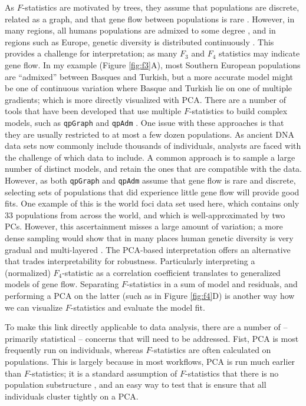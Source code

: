 \documentclass[12pt,fullpage, a4paper]{article}
\begin{document}
As $F$-statistics are motivated by trees, they assume that populations are discrete, related as a graph, and that gene flow between populations is rare \citep{patterson2012,harney2021}. However, in many regions, all humans populations are admixed to some degree \citep{pickrell2014}, and in regions such as Europe, genetic diversity is distributed continuously \citep{novembre2008, novembre2008a}. This provides a challenge for interpretation; as many $F_3$ and $F_4$ statistics may indicate gene flow. In my example (Figure \ref{fig:f3}A), most Southern European populations are ``admixed'' between Basques and Turkish, but a more accurate model might be one of continuous variation where Basque and Turkish lie on one of multiple gradients; which is more directly visualized with PCA. There are a number of tools that have been developed that use multiple $F$-statistics to build complex models, such as \texttt{qpGraph} \citep{lazaridis2014} and \texttt{qpAdm} \citep{harney2021}. One issue with these approaches is that they are usually restricted to at most a few dozen populations. As ancient DNA data sets now commonly include thousands of individuals, analysts are faced with the challenge of which data to include. A common approach is to sample a large number of distinct models, and retain the ones that are compatible with the data. However, as both \texttt{qpGraph} and \texttt{qpAdm} assume that gene flow is rare and discrete, selecting sets of populations that did experience little gene flow will provide good fits. One example of this is the world foci data set used here, which contains only 33 populations from across the world, and which is well-approximated by two PCs. However, this ascertainment misses a large amount of variation; a more dense sampling would show that in many places human genetic diversity is very gradual and multi-layered \citep{lazaridis2014, peter2020a}. The PCA-based  interpretation offers an alternative that trades interpretability for robustness. Particularly interpreting a (normalized) $F_4$-statistic as a correlation coefficient translates to generalized models of gene flow. Separating $F$-statistics in a sum of model and residuals, and performing a PCA on the latter (such as in Figure \ref{fig:f4}D)  is another way how we can visualize $F$-statistics and evaluate the model fit.

To make this link directly applicable to data analysis, there are a number of -- primarily statistical -- concerns that will need to be addressed. Fist, PCA is most frequently run on individuals, whereas $F$-statistics are often calculated on populations. This is largely because in most workflows, PCA is run much earlier than $F$-statistics; it is a standard assumption of $F$-statistics that there is no population substructure \citep{patterson2012}, and an easy way to test that is ensure that all individuals cluster tightly on a PCA. 
\end{document}
